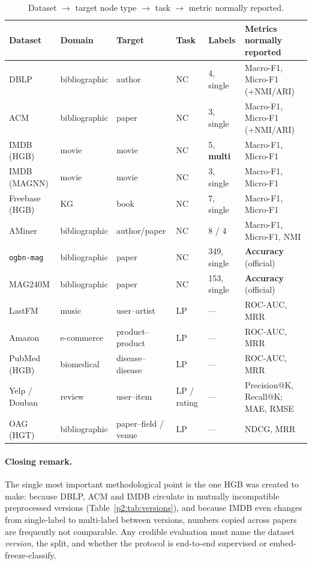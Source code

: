 \begin{table}[htbp]
\centering
\small
\caption{Dataset $\to$ target node type $\to$ task $\to$ metric normally reported.}
\label{p2:tab:summary}
\begin{tabular}{llllll}
\toprule
Dataset & Domain & Target & Task & Labels & Metrics normally reported \\
\midrule
DBLP      & bibliographic & author  & NC     & 4, single & Macro-F1, Micro-F1 (+NMI/ARI) \\
ACM       & bibliographic & paper   & NC     & 3, single & Macro-F1, Micro-F1 (+NMI/ARI) \\
IMDB (HGB)& movie         & movie   & NC     & 5, \textbf{multi} & Macro-F1, Micro-F1 \\
IMDB (MAGNN)& movie       & movie   & NC     & 3, single & Macro-F1, Micro-F1 \\
Freebase (HGB) & KG       & book    & NC     & 7, single & Macro-F1, Micro-F1 \\
AMiner    & bibliographic & author/paper & NC & 8 / 4    & Macro-F1, Micro-F1, NMI \\
\texttt{ogbn-mag} & bibliographic & paper & NC & 349, single & \textbf{Accuracy} (official) \\
MAG240M   & bibliographic & paper   & NC     & 153, single & \textbf{Accuracy} (official) \\
\midrule
LastFM    & music         & user--artist & LP & ---      & ROC-AUC, MRR \\
Amazon    & e-commerce    & product--product & LP & ---  & ROC-AUC, MRR \\
PubMed (HGB) & biomedical & disease--disease & LP & ---  & ROC-AUC, MRR \\
Yelp / Douban & review    & user--item & LP / rating & --- & Precision@K, Recall@K; MAE, RMSE \\
OAG (HGT) & bibliographic & paper--field / venue & LP & --- & NDCG, MRR \\
\bottomrule
\end{tabular}
\end{table}

\paragraph{Closing remark.} The single most important methodological point is the one HGB was
created to make: because DBLP, ACM and IMDB circulate in mutually incompatible preprocessed
versions (Table~\ref{p2:tab:versions}), and because IMDB even changes from single-label to
multi-label between versions, numbers copied across papers are frequently not comparable. Any
credible evaluation must name the dataset \emph{version}, the split, and whether the protocol is
end-to-end supervised or embed-freeze-classify.

